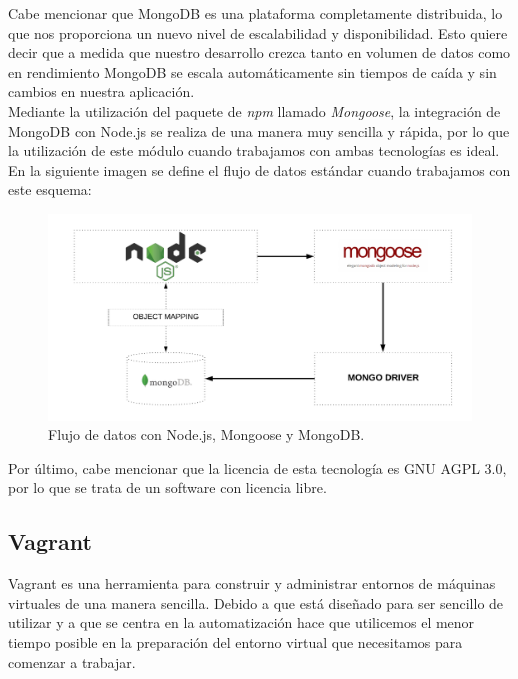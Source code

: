 Cabe mencionar que MongoDB es una plataforma completamente distribuida, lo que nos proporciona 
un nuevo nivel de escalabilidad y disponibilidad. Esto quiere decir que a medida que nuestro desarrollo
crezca tanto en volumen de datos como en rendimiento MongoDB se escala automáticamente sin tiempos
de caída y sin cambios en nuestra aplicación.\\

Mediante la utilización del paquete de \textit{npm} llamado \textit{Mongoose}\cite{mongoose}, la integración de MongoDB
con Node.js se realiza de una manera muy sencilla y rápida, por lo que la utilización de este módulo
cuando trabajamos con ambas tecnologías es ideal. En la siguiente imagen se define el flujo de datos
estándar cuando trabajamos con este esquema:

\begin{figure}[H]
	\centering
	\includegraphics[scale=0.28]{imagenes/node-mongo.PNG}
	\caption{Flujo de datos con Node.js, Mongoose y MongoDB. \label{fig:figura5}}
\end{figure}


Por último, cabe mencionar que la licencia de esta tecnología es GNU AGPL 3.0\cite{agpl}, por lo que se trata de un software con licencia
libre.



\subsection{Vagrant}

Vagrant es una herramienta para construir y administrar entornos de máquinas virtuales de una 
manera sencilla. Debido a que está diseñado para ser sencillo de utilizar y a que se centra en 
la automatización hace que utilicemos el menor tiempo posible en la preparación del entorno virtual
que necesitamos para comenzar a trabajar.\\

